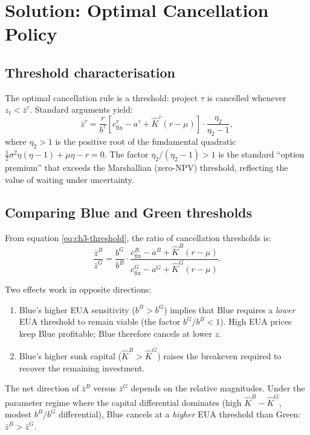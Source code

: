 \documentclass[11pt,a4paper]{article}
\begin{document}
\section{Solution: Optimal Cancellation Policy}
\label{sec:ch3-solution}

\subsection{Threshold characterisation}

The optimal cancellation rule is a threshold: project $\tau$ is cancelled whenever $z_t < \bar{z}^{\tau}$. Standard arguments \citep[][Chapter 6]{dixit1994investment} yield:
\begin{equation}
\bar{z}^{\tau} = \frac{r}{b^{\tau}} \left[ c^{\tau}_{\mathrm{fix}} - a^{\tau} + \hat{K}^{\tau} (r - \mu) \right] \cdot \frac{\eta_2}{\eta_2 - 1},
\label{eq:ch3-threshold}
\end{equation}
where $\eta_2 > 1$ is the positive root of the fundamental quadratic $\frac{1}{2}\sigma^2 \eta(\eta-1) + \mu \eta - r = 0$. The factor $\eta_2 / (\eta_2 - 1) > 1$ is the standard ``option premium'' that exceeds the Marshallian (zero-NPV) threshold, reflecting the value of waiting under uncertainty.

\subsection{Comparing Blue and Green thresholds}

From equation \eqref{eq:ch3-threshold}, the ratio of cancellation thresholds is:
\begin{equation}
\frac{\bar{z}^B}{\bar{z}^G} = \frac{b^G}{b^B} \cdot \frac{c^{B}_{\mathrm{fix}} - a^B + \hat{K}^B(r - \mu)}{c^{G}_{\mathrm{fix}} - a^G + \hat{K}^G(r - \mu)}.
\end{equation}

Two effects work in opposite directions:
\begin{enumerate}
    \item Blue's higher EUA sensitivity ($b^B > b^G$) implies that Blue requires a \textit{lower} EUA threshold to remain viable (the factor $b^G/b^B < 1$). High EUA prices keep Blue profitable; Blue therefore cancels at lower $z$.
    \item Blue's higher sunk capital ($\hat{K}^B > \hat{K}^G$) raises the breakeven required to recover the remaining investment.
\end{enumerate}
The net direction of $\bar{z}^B$ versus $\bar{z}^G$ depends on the relative magnitudes. Under the parameter regime where the capital differential dominates (high $\hat{K}^B - \hat{K}^G$, modest $b^B/b^G$ differential), Blue cancels at a \textit{higher} EUA threshold than Green: $\bar{z}^B > \bar{z}^G$.
\end{document}
